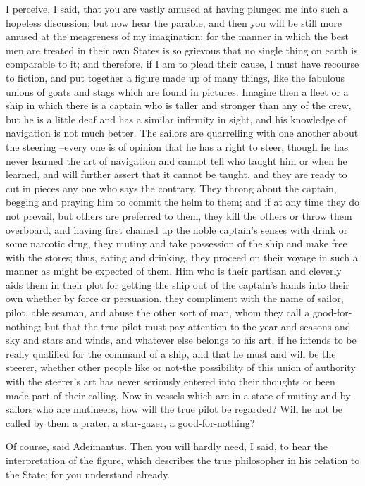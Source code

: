 I perceive, I said, that you are vastly amused at having plunged me into such a hopeless discussion; but now hear the parable, and then you will be still more amused at the meagreness of my imagination: for the manner in which the best men are treated in their own States is so grievous that no single thing on earth is comparable to it; and therefore, if I am to plead their cause, I must have recourse to fiction, and put together a figure made up of many things, like the fabulous unions of goats and stags which are found in pictures. Imagine then a fleet or a ship in which there is a captain who is taller and stronger than any of the crew, but he is a little deaf and has a similar infirmity in sight, and his knowledge of navigation is not much better. The sailors are quarrelling with one another about the steering --every one is of opinion that he has a right to steer, though he has never learned the art of navigation and cannot tell who taught him or when he learned, and will further assert that it cannot be taught, and they are ready to cut in pieces any one who says the contrary. They throng about the captain, begging and praying him to commit the helm to them; and if at any time they do not prevail, but others are preferred to them, they kill the others or throw them overboard, and having first chained up the noble captain's senses with drink or some narcotic drug, they mutiny and take possession of the ship and make free with the stores; thus, eating and drinking, they proceed on their voyage in such a manner as might be expected of them. Him who is their partisan and cleverly aids them in their plot for getting the ship out of the captain's hands into their own whether by force or persuasion, they compliment with the name of sailor, pilot, able seaman, and abuse the other sort of man, whom they call a good-for-nothing; but that the true pilot must pay attention to the year and seasons and sky and stars and winds, and whatever else belongs to his art, if he intends to be really qualified for the command of a ship, and that he must and will be the steerer, whether other people like or not-the possibility of this union of authority with the steerer's art has never seriously entered into their thoughts or been made part of their calling. Now in vessels which are in a state of mutiny and by sailors who are mutineers, how will the true pilot be regarded? Will he not be called by them a prater, a star-gazer, a good-for-nothing?

Of course, said Adeimantus.
Then you will hardly need, I said, to hear the interpretation of the figure, which describes the true philosopher in his relation to the State; for you understand already.


